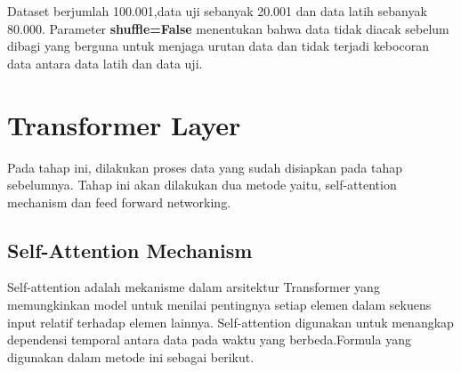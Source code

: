 
Dataset berjumlah 100.001,data uji sebanyak 20.001 dan data latih sebanyak 80.000. Parameter \textbf{shuffle=False} menentukan bahwa data tidak diacak sebelum dibagi yang berguna untuk menjaga urutan data dan tidak terjadi kebocoran data antara data latih dan data uji.



\section{Transformer Layer}
Pada tahap ini, dilakukan proses data yang sudah disiapkan pada tahap sebelumnya. Tahap ini akan dilakukan dua metode yaitu, self-attention mechanism dan feed forward networking.

\subsection{Self-Attention Mechanism}
Self-attention adalah mekanisme dalam arsitektur Transformer yang memungkinkan model untuk menilai pentingnya setiap elemen dalam sekuens input relatif terhadap elemen lainnya. Self-attention digunakan untuk menangkap dependensi temporal antara data pada waktu yang berbeda.Formula yang digunakan dalam metode ini sebagai berikut.

